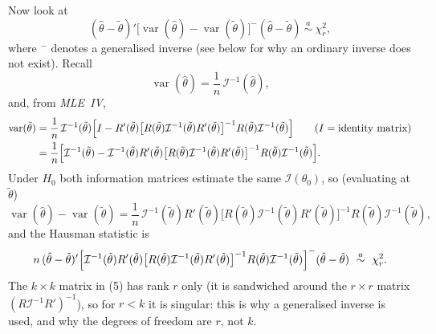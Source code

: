 \documentclass[11pt]{article}
\begin{document}
Now look at
\begin{equation}\tag{4}
 (\hat\theta-\tilde\theta)'\bigl[\operatorname{var}(\hat\theta)-\operatorname{var}(\tilde\theta)\bigr]^{-}(\hat\theta-\tilde\theta)
 \ \overset{a}{\sim}\ \chi^{2}_{r},
\end{equation}
where ${}^{-}$ denotes a generalised inverse (see below for why an ordinary inverse does not exist).
Recall
\[ \operatorname{var}(\hat\theta)=\frac1n\,\mathcal I^{-1}(\hat\theta), \]
and, from \emph{MLE~IV},
\begin{align*}
 \operatorname{var}(\tilde\theta)
 &=\frac1n\,\mathcal I^{-1}(\tilde\theta)\Bigl[I-R'(\tilde\theta)\bigl[R(\tilde\theta)\mathcal I^{-1}(\tilde\theta)R'(\tilde\theta)\bigr]^{-1}R(\tilde\theta)\mathcal I^{-1}(\tilde\theta)\Bigr]
 \qquad(I=\text{identity matrix})\\
 &=\frac1n\Bigl[\mathcal I^{-1}(\tilde\theta)-\mathcal I^{-1}(\tilde\theta)R'(\tilde\theta)\bigl[R(\tilde\theta)\mathcal I^{-1}(\tilde\theta)R'(\tilde\theta)\bigr]^{-1}R(\tilde\theta)\mathcal I^{-1}(\tilde\theta)\Bigr].
\end{align*}
Under $H_{0}$ both information matrices estimate the same $\mathcal I(\theta_{0})$, so (evaluating at $\tilde\theta$)
\begin{equation}\tag{5}
 \operatorname{var}(\hat\theta)-\operatorname{var}(\tilde\theta)
 =\frac1n\,\mathcal I^{-1}(\tilde\theta)R'(\tilde\theta)\bigl[R(\tilde\theta)\mathcal I^{-1}(\tilde\theta)R'(\tilde\theta)\bigr]^{-1}R(\tilde\theta)\mathcal I^{-1}(\tilde\theta),
\end{equation}
and the Hausman statistic is
\[ n\,(\hat\theta-\tilde\theta)'\Bigl[\mathcal I^{-1}(\tilde\theta)R'(\tilde\theta)\bigl[R(\tilde\theta)\mathcal I^{-1}(\tilde\theta)R'(\tilde\theta)\bigr]^{-1}R(\tilde\theta)\mathcal I^{-1}(\tilde\theta)\Bigr]^{-}(\hat\theta-\tilde\theta)
   \ \overset{a}{\sim}\ \chi^{2}_{r}. \]
The $k\times k$ matrix in (5) has rank $r$ only (it is sandwiched around the $r\times r$ matrix
$(R\mathcal I^{-1}R')^{-1}$), so for $r<k$ it is singular: this is why a generalised inverse is used, and why
the degrees of freedom are $r$, not $k$.
\end{document}
